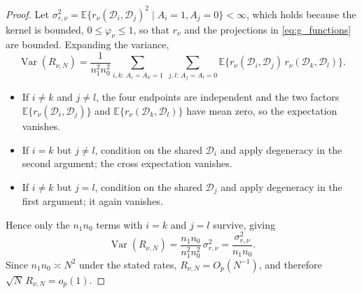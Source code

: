 \documentclass[11pt,a4paper]{article}
\newcommand{\E}{\mathbb{E}}
\newcommand{\Var}{\operatorname{Var}}
\newcommand{\op}{o_p}
\newcommand{\Op}{O_p}
\begin{document}
\begin{proof}
Let $\sigma_{r,\nu}^2=\E\{r_\nu(\mathcal{D}_i,\mathcal{D}_j)^2\mid A_i=1,A_j=0\}<\infty$,
which holds because the kernel is bounded, $0\le\varphi_\nu\le 1$, so that $r_\nu$ and the
projections in \eqref{eq:g_functions} are bounded. Expanding the variance,
\[
\Var(R_{\nu,N})=\frac{1}{n_1^2 n_0^2}
\sum_{i,k:\,A_i=A_k=1}\ \sum_{j,l:\,A_j=A_l=0}
\E\{r_\nu(\mathcal{D}_i,\mathcal{D}_j)\,r_\nu(\mathcal{D}_k,\mathcal{D}_l)\}.
\]
\begin{itemize}
    \item If $i\ne k$ and $j\ne l$, the four endpoints are independent and the two factors $\E\{r_\nu(\mathcal{D}_i,\mathcal{D}_j)\}$ and $\E\{r_\nu(\mathcal{D}_k,\mathcal{D}_l)\}$ have mean zero, so the expectation vanishes.
    \item If $i=k$ but $j\ne l$, condition on the shared $\mathcal{D}_i$ and apply degeneracy in the second argument; the cross expectation vanishes.
    \item  If $i\ne k$ but $j=l$, condition on the shared $\mathcal{D}_j$ and apply degeneracy in the first argument; it again vanishes.
\end{itemize}
  Hence only the $n_1 n_0$ terms with
$i=k$ and $j=l$ survive, giving
\[
\Var(R_{\nu,N})
=\frac{n_1 n_0}{n_1^2 n_0^2}\,\sigma_{r,\nu}^2
=\frac{\sigma_{r,\nu}^2}{n_1 n_0}.
\]
Since $n_1 n_0\asymp N^2$ under the stated rates, $R_{\nu,N}=\Op(N^{-1})$, and therefore
$\sqrt{N}\,R_{\nu,N}=\op(1)$.
\end{proof}
\end{document}
